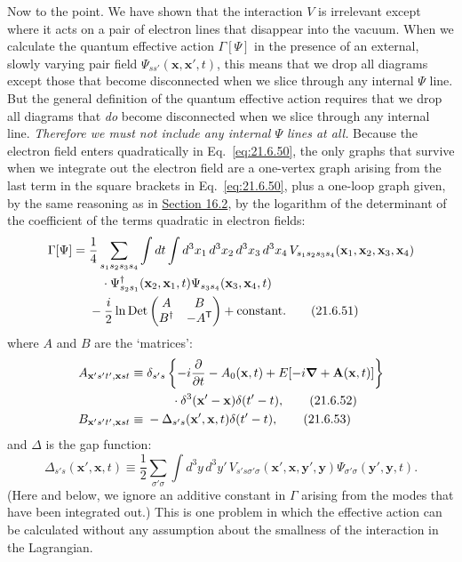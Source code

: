 Now to the point. We have shown that the interaction $V$ is irrelevant except where it acts on a pair of electron lines that disappear into the vacuum. When we calculate the quantum effective action $\Gamma[\Psi]$ in the presence of an external, slowly varying pair field $\Psi_{ss'}(\mathbf x,\mathbf x',t)$, this means that we drop all diagrams except those that become disconnected when we slice through any internal $\Psi$ line. But the general definition of the quantum effective action requires that we drop all diagrams that \emph{do} become disconnected when we slice through any internal line. \emph{Therefore we must not include any internal $\Psi$ lines at all.} Because the electron field enters quadratically in Eq.~\eqref{eq:21.6.50}, the only graphs that survive when we integrate out the electron field are a one-vertex graph arising from the last term in the square brackets in Eq.~\eqref{eq:21.6.50}, plus a one-loop graph given, by the same reasoning as in \hyperref[sec:16.2]{Section 16.2}, by the logarithm of the determinant of the coefficient of the terms quadratic in electron fields:
\begin{align}
\Gamma[\Psi]
={}&\frac14\sum_{s_1s_2s_3s_4}
\int dt\int d^3x_1\,d^3x_2\,d^3x_3\,d^3x_4\,
V_{s_1s_2s_3s_4}(\mathbf x_1,\mathbf x_2,\mathbf x_3,\mathbf x_4)
\notag\\
&\quad\cdot
\Psi^\dagger_{s_2s_1}(\mathbf x_2,\mathbf x_1,t)
\Psi_{s_3s_4}(\mathbf x_3,\mathbf x_4,t)
\notag\\
&-\frac{i}{2}\ln\operatorname{Det}
\begin{pmatrix}
A&B\\
B^\dagger&-A^{\mathsf T}
\end{pmatrix}
+\text{constant}.
\tag{21.6.51}\label{eq:21.6.51}
\end{align}
where $A$ and $B$ are the `matrices':
\begin{align}
A_{\mathbf x's't',\mathbf xst}
\equiv{}&\delta_{s's}
\left\{
-i\frac{\partial}{\partial t}-A_0(\mathbf x,t)
+E[-i\boldsymbol\nabla+\mathbf A(\mathbf x,t)]
\right\}
\notag\\
&\qquad\cdot\delta^3(\mathbf x'-\mathbf x)\delta(t'-t),
\tag{21.6.52}\label{eq:21.6.52}\\
B_{\mathbf x's't',\mathbf xst}
\equiv{}&-\Delta_{s's}(\mathbf x',\mathbf x,t)\delta(t'-t),
\tag{21.6.53}\label{eq:21.6.53}
\end{align}
and $\Delta$ is the gap function:
\begin{equation}
\Delta_{s's}(\mathbf x',\mathbf x,t)
\equiv\frac12\sum_{\sigma'\sigma}
\int d^3y\,d^3y'\,
V_{s's\sigma'\sigma}(\mathbf x',\mathbf x,\mathbf y',\mathbf y)
\Psi_{\sigma'\sigma}(\mathbf y',\mathbf y,t).
\tag{21.6.54}\label{eq:21.6.54}
\end{equation}
(Here and below, we ignore an additive constant in $\Gamma$ arising from the modes that have been integrated out.) This is one problem in which the effective action can be calculated without any assumption about the smallness of the interaction in the Lagrangian.

